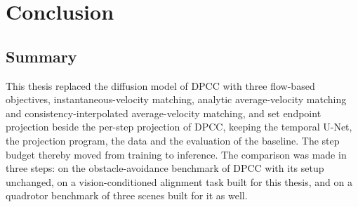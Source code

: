 
\chapter{Conclusion}\label{ch:conclusion}

\section{Summary}\label{sec:conc:summary}

This thesis replaced the diffusion model of \ac{DPCC} with three flow-based objectives,
instantaneous-velocity matching, analytic average-velocity matching and consistency-interpolated
average-velocity matching, and set endpoint projection beside the per-step projection of \ac{DPCC},
keeping the temporal U-Net, the projection program, the data and the evaluation of the baseline. The
step budget thereby moved from training to inference. The comparison was made in three steps: on the
obstacle-avoidance benchmark of \ac{DPCC} with its setup unchanged, on a vision-conditioned alignment
task built for this thesis, and on a quadrotor benchmark of three scenes built for it as well.

